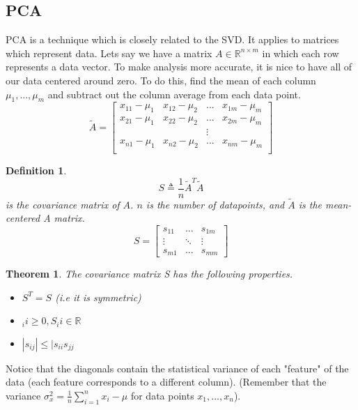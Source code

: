 \documentclass{article}
\newtheorem{theorem}{Theorem}
\newtheorem{definition}{Definition}
\begin{document}
\subsection{PCA}
PCA is a technique which is closely related to the SVD. It applies to matrices which represent data.
Lets say we have a matrix $A \in \mathbb{R}^{n \times m}$ in which each row represents a data vector.
To make analysis more accurate, it is nice to have all of our data centered around zero.
To do this, find the mean of each column $\mu_1, ..., \mu_m$ and subtract out the column average from each data point.
\[
    \tilde{A} = \left[
        \begin{array}{cccc}
            x_{11} - \mu_1 & x_{12} - \mu_2 & ... &x_{1m} - \mu_m\\
            x_{21} - \mu_1 & x_{22} - \mu_2 & ... &x_{2m} - \mu_m\\
             & & \vdots & \\
             x_{n1} - \mu_1 & x_{n2} - \mu_2 & ... &x_{nm} - \mu_m\\
        \end{array}
    \right]
\]
\begin{definition}
    $$ S \triangleq \frac{1}{n}\tilde{A}^T\tilde{A}$$
    is the covariance matrix of $A$. $n$ is the number of datapoints,
    and $\tilde{A}$ is the mean-centered A matrix.
    \[
        S = \left[
            \begin{array}{ccc}
                s_{11} & ... & s_{1m}\\
                \vdots & \ddots & \vdots\\
                s_{m1} & ... & s_{mm}
            \end{array}
        \right]
    \]
\end{definition}
\begin{theorem}
    The covariance matrix S has the following properties.
    \begin{itemize}
        \item $S^T = S$ (i.e it is symmetric)
        \item $_ii \ge 0, S_ii \in \mathbb{R}$
        \item $|s_{ij}| \le |s_{ii}s_{jj}$
    \end{itemize}
\end{theorem}
Notice that the diagonals contain the statistical variance of each "feature" of the data (each feature corresponds to a different column).
(Remember that the variance $\sigma_x^2 = \frac{1}{n}\sum_{i=1}^{n}{x_i-\mu}$ for data points $x_1, ..., x_n$).
\end{document}
